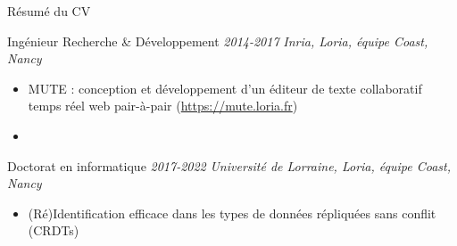\begin{frame}{Résumé du CV}


    \begin{block}{Ingénieur Recherche \& Développement \hspace*{\fill} \textnormal{\emph{2014-2017}}}
        \vspace{0mm}
        \emph{Inria, Loria, équipe Coast, Nancy}
        \begin{itemize}
            \item MUTE : conception et développement d'un éditeur de texte collaboratif temps réel web pair-à-pair (\url{https://mute.loria.fr})
            \item
        \end{itemize}
    \end{block}

    \begin{block}{Doctorat en informatique \hspace*{\fill} \textnormal{\emph{2017-2022}}}
        \vspace{0mm}
        \emph{Université de Lorraine, Loria, équipe Coast, Nancy}
        \begin{itemize}
            \item (Ré)Identification efficace dans les types de données répliquées sans conflit (CRDTs)
        \end{itemize}
    \end{block}
\end{frame}
